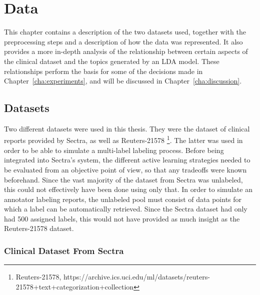 \chapter{Data}
\label{cha:data}

This chapter contains a description of the two datasets used, together with the preprocessing steps and a description of how the data was represented.
It also provides a more in-depth analysis of the relationship between certain aspects of the clinical dataset and the topics generated by an LDA model.
These relationships perform the basis for some of the decisions made in Chapter~\ref{cha:experiments}, and will be discussed in Chapter~\ref{cha:discussion}.

\section{Datasets}\label{sec:datasets}

Two different datasets were used in this thesis.
They were the dataset of clinical reports provided by Sectra, as well as Reuters-21578 \footnote{Reuters-21578, https://archive.ics.uci.edu/ml/datasets/reuters-21578+text+categorization+collection}.
The latter was used in order to be able to simulate a multi-label labeling process.
Before being integrated into Sectra's system, the different active learning strategies needed to be evaluated from an objective point of view, so that any tradeoffs were known beforehand.
Since the vast majority of the dataset from Sectra was unlabeled, this could not effectively have been done using only that.
In order to simulate an annotator labeling reports, the unlabeled pool must consist of data points for which a label can be automatically retrieved.
Since the Sectra dataset had only had 500 assigned labels, this would not have provided as much insight as the Reuters-21578 dataset.

\subsection{Clinical Dataset From Sectra}

